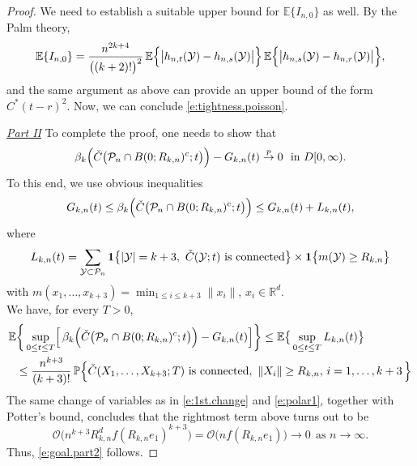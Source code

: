 \documentclass[11pt]{amsart}
\numberwithin{equation}{section}
\theoremstyle{plain}
\theoremstyle{definition}
\begin{document}
\begin{proof}
We need to establish a suitable upper bound for ${\mathbb{E}} \{ I_{n,0} \}$ as well. By the Palm theory,
$$
{\mathbb{E}} \{  I_{n,0}\} = \frac{n^{2k+4}}{\bigl( (k+2)! \bigr)^2}\, {\mathbb{E}} \Bigl\{  \bigl| h_{n,t}({{\mathcal{Y}}}) - h_{n,s}({{\mathcal{Y}}})  \bigr| \Bigr\}\, {\mathbb{E}} \Bigl\{  \bigl| h_{n,s}({{\mathcal{Y}}}) - h_{n,r}({{\mathcal{Y}}})  \bigr| \Bigr\},
$$
and the same argument as above can provide an upper bound of the form $C^*(t-r)^2$. Now, we can conclude \eqref{e:tightness.poisson}.
\vspace{5pt}

\noindent \underline{\textit{Part II}} To complete the proof, one needs to show that
\begin{equation}  \label{e:goal.part2}
 \beta_k \Bigl( \check{C}\bigl( {\mathcal P_n} \cap B(0;R_{k,n})^c; t \bigr) \Bigr) - G_{k,n}(t) \stackrel{p}{\to} 0 \ \ \text{in } D[0,\infty).
\end{equation}
To this end, we use obvious inequalities
$$
G_{k,n}(t) \leq \beta_k \Bigl( \check{C}\bigl( {\mathcal P_n} \cap B(0;R_{k,n})^c; t \bigr) \Bigr) \leq G_{k,n}(t) + L_{k,n}(t),
$$
where
$$
L_{k,n}(t) = \sum_{{{\mathcal{Y}}} \subset {\mathcal P_n}} {{\bf 1}} \bigl\{  |{{\mathcal{Y}}}| = k+3, \ \check{C}({{\mathcal{Y}}}; t) \text{ is connected}  \bigr\} \times {{\bf 1}} \bigl\{  m({{\mathcal{Y}}}) \geq R_{k,n} \bigr\}
$$
with $m(x_1,\dots, x_{k+3}) = \min_{1 \leq i \leq k+3} \| x_i \|$, $x_i \in {{\mathbb R}}^d$. \\
We have, for every $T>0$,
\begin{align*}
{\mathbb{E}} &\biggl\{  \, \sup_{0 \leq t \leq T} \Bigl[\,  \beta_k \Bigl( \check{C}\bigl( {\mathcal P_n} \cap B(0;R_{k,n})^c; t \bigr) \Bigr) - G_{k,n}(t) \Bigr]  \biggr\} \leq  {\mathbb{E}} \bigl\{ \, \sup_{0 \leq t \leq T} L_{k,n}(t) \bigr\}  \\
&\leq \frac{n^{k+3}}{(k+3)!}\, {\mathbb{P}} \Bigl\{  \check{C}(X_1,\dots,X_{k+3}; T) \text{ is connected}, \ \| X_i \| \geq R_{k,n}, \, i =1,\dots,k+3\,  \Bigr\}
\end{align*}
The same change of variables as in \eqref{e:1st.change} and \eqref{e:polar1}, together with Potter's bound, concludes that the rightmost term above turns out to be
$$
\mathcal O \bigl( n^{k+3} R_{k,n}^d f(R_{k,n}e_1)^{k+3} \bigr) = \mathcal O \bigl( n f(R_{k,n}e_1) \bigr) \to 0 \ \ \text{as } n \to \infty.
$$
Thus, \eqref{e:goal.part2} follows.
\end{proof}
\end{document}
